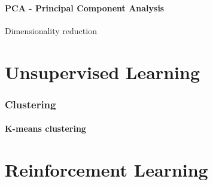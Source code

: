 \documentclass{scrartcl}
\begin{document}
\subsection{PCA - Principal Component Analysis}

Dimensionality reduction

\newpage
\part{Unsupervised Learning}

\section{Clustering}

\subsection{K-means clustering}

\newpage
\part{Reinforcement Learning}
\end{document}
